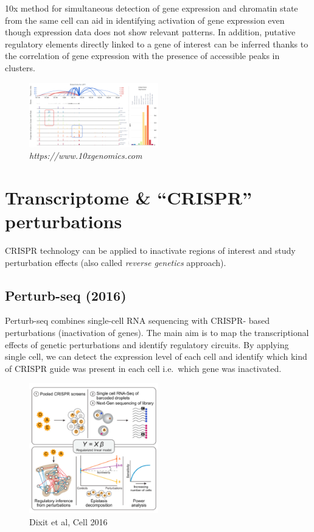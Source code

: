 10x method for simultaneous detection of gene expression and chromatin
state from the same cell can aid in identifying activation of gene
expression even though expression data does not show relevant patterns.
In addition, putative regulatory elements directly linked to a gene of
interest can be inferred thanks to the correlation of gene expression
with the presence of accessible peaks in clusters.

\begin{figure}
\centering
\includegraphics[width=0.5\textwidth]{images/Screenshot_11.png}
\caption{\emph{https://www.10xgenomics.com}}
\end{figure}

\hypertarget{transcriptome-crispr-perturbations}{%
\section{Transcriptome \& ``CRISPR''
perturbations}\label{transcriptome-crispr-perturbations}}

CRISPR technology can be applied to inactivate regions of interest and
study perturbation effects (also called \emph{reverse genetics}
approach).

\hypertarget{perturb-seq-2016}{%
\subsection{Perturb-seq (2016)}\label{perturb-seq-2016}}

Perturb-seq combines single-cell RNA sequencing with CRISPR- based
perturbations (inactivation of genes). The main aim is to map the
transcriptional effects of genetic perturbations and identify regulatory
circuits. By applying single cell, we can detect the expression level of
each cell and identify which kind of CRISPR guide was present in each
cell i.e.~which gene was inactivated.

\begin{figure}
\centering
\includegraphics[width=0.5\textwidth]{images/Screen_Shot_2023-02-22_at_20-40-56.png}
\caption{Dixit et al, Cell 2016}
\end{figure}


